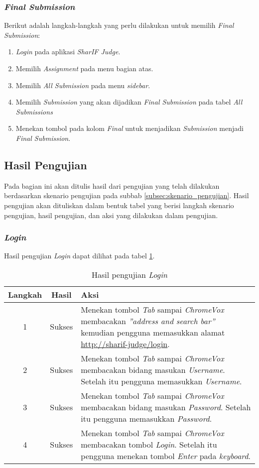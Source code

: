 \subsubsection{\textit{Final Submission}}
\label{subsubsec:skenario_final_submission}
Berikut adalah langkah-langkah yang perlu dilakukan untuk memilih \textit{Final Submission}:

\begin{enumerate}
	\item \textit{Login} pada aplikasi \textit{SharIF Judge}.
	\item Memilih \textit{Assignment} pada menu bagian atas.
	\item Memilih \textit{All Submission} pada menu \textit{sidebar}.
	\item Memilih \textit{Submission} yang akan dijadikan \textit{Final Submission} pada tabel \textit{All Submissions}
	\item Menekan tombol pada kolom \textit{Final} untuk menjadikan \textit{Submission} menjadi \textit{Final Submission}.
\end{enumerate}

\subsection{Hasil Pengujian}
\label{subsec:hasil_pengujian}
Pada bagian ini akan ditulis hasil dari pengujian yang telah dilakukan berdasarkan skenario pengujian pada subbab \ref{subsec:skenario_pengujian}. Hasil pengujian akan dituliskan dalam bentuk tabel yang berisi langkah skenario pengujian, hasil pengujian, dan aksi yang dilakukan dalam pengujian.

\subsubsection{\textit{Login}}
\label{subsubsec:hasil_login}
Hasil pengujian \textit{Login} dapat dilihat pada tabel \ref{tab:hasil_login}.

\begin{table}[H]
	\centering
	\caption{Hasil pengujian \textit{Login}}
	\label{tab:hasil_login}
	\begin{tabular}{|c|c|p{12cm}|}
		\toprule
		Langkah & Hasil & Aksi\\
		\midrule
		1 & Sukses & Menekan tombol \textit{Tab} sampai \textit{ChromeVox} membacakan \textit{''address and search bar''} kemudian pengguna memasukkan alamat \url{http://sharif-judge/login}.\\
		2 & Sukses & Menekan tombol \textit{Tab} sampai \textit{ChromeVox} membacakan bidang masukan \textit{Username}. Setelah itu pengguna memasukkan \textit{Username}.\\
		3 & Sukses & Menekan tombol \textit{Tab} sampai \textit{ChromeVox} membacakan bidang masukan \textit{Password}. Setelah itu pengguna memasukkan \textit{Password}. \\
		4 & Sukses & Menekan tombol \textit{Tab} sampai \textit{ChromeVox} membacakan tombol \textit{Login}. Setelah itu pengguna menekan tombol \textit{Enter} pada \textit{keyboard}.\\
		\bottomrule
	\end{tabular}
\end{table}

